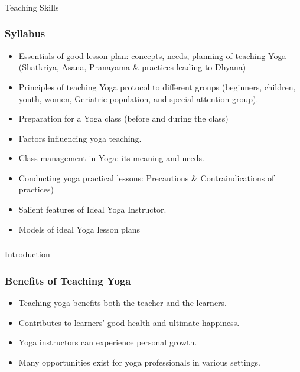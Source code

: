 \begin{frame}[fragile]\frametitle{}
\begin{center}
{\Large Teaching Skills }
\end{center}
\end{frame}

\begin{frame}[fragile]\frametitle{Syllabus}

\begin{itemize}
\item  Essentials  of  good  lesson  plan:  concepts,  needs,  planning  of  teaching  Yoga  (Shatkriya, Asana, Pranayama \& practices leading to Dhyana) 
\item  Principles  of  teaching  Yoga  protocol  to  different  groups  (beginners,  children,  youth, women, Geriatric population, and special attention group). 
\item  Preparation for a Yoga class (before and during the class) 
\item  Factors influencing yoga teaching. 
\item  Class management in Yoga: its meaning and needs. 
\item  Conducting yoga practical lessons: Precautions \& Contraindications of practices)  
\item  Salient features of Ideal Yoga Instructor.  
\item  Models of ideal Yoga lesson plans 
\end{itemize}
\end{frame}

\begin{frame}[fragile]\frametitle{}
\begin{center}
{\Large Introduction}
\end{center}
\end{frame}

\begin{frame}[fragile]\frametitle{Benefits of Teaching Yoga}
      \begin{itemize}
          \item Teaching yoga benefits both the teacher and the learners.
          \item Contributes to learners' good health and ultimate happiness.
          \item Yoga instructors can experience personal growth.
          \item Many opportunities exist for yoga professionals in various settings.
      \end{itemize}
\end{frame}

